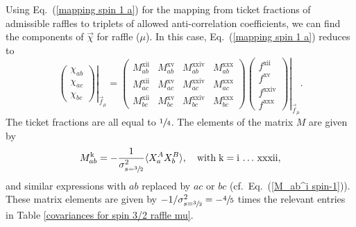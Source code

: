 Using Eq.\ (\ref{mapping spin 1 a}) for the mapping from ticket fractions of admissible raffles to triplets of allowed anti-correlation coefficients, we can find the components of $\vec{\chi}$ for raffle ($\mu$). In this case, Eq.\ (\ref{mapping spin 1 a}) reduces to
\begin{equation}
\left. \begin{pmatrix}
\chi_{ab}\\[.3cm]
\chi_{ac}\\[.3cm]
\chi_{bc}
\end{pmatrix} \right|_{\vec{f}_\mu}
= \left. \begin{pmatrix}
M_{ab}^{\mathrm{xii}} & M_{ab}^{\mathrm{xv}} & M_{ab}^{\mathrm{xxiv}} & M_{ab}^{\mathrm{xxx}} \\[.4cm]
M_{ac}^{\mathrm{xii}} & M_{ac}^{\mathrm{xv}} & M_{ac}^{\mathrm{xxiv}} &  M_{ac}^{\mathrm{xxx}} \\[.4cm]
M_{bc}^{\mathrm{xii}} & M_{bc}^{\mathrm{xv}} & M_{bc}^{\mathrm{xxiv}} &  M_{bc}^{\mathrm{xxx}}
 \end{pmatrix}
\!\! \begin{pmatrix}
f^{\mathrm{xii}} \\[.1cm]
f^{\mathrm{xv}} \\[.1cm]
f^{\mathrm{xxiv}} \\[.1cm]
f^{\mathrm{xxx}}
\end{pmatrix} \right|_{\vec{f}_\mu}. 
\label{mapping for raffle mu}
\end{equation}
The ticket fractions are all equal to $\sfrac14$. The elements of the matrix $M$ are given by
\begin{equation}
M^{\mathrm{k}}_{ab} = -\frac{1}{\sigma_{s = \sfrac32}^2} \langle X^A_a X^B_b \rangle, \quad \mathrm{with \; k  =  i \, \ldots \, xxxii},  
\end{equation}
and similar expressions with $ab$ replaced by $ac$ or $bc$ (cf.\ Eq.\ (\ref{M_ab^i spin-1})). These matrix elements are given by $- 1/\sigma_{s = \sfrac32}^2 = -\sfrac45$ times the relevant entries in Table \ref{covariances for spin 3/2 raffle mu}. 

